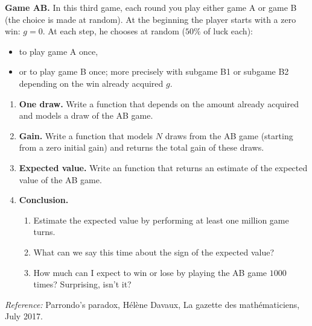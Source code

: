 \documentclass[11pt,class=report,crop=false]{standalone}
\begin{document}


\begin{activite}


\textbf{Game AB.} In this third game, each round you play either game A or game B (the choice is made at random). 
At the beginning the player starts with a zero win: $g=0$. 
At each step, he chooses at random ($50\%$ of luck each):
\begin{itemize}
  \item to play game A once,
  \item or to play game B once; more precisely with subgame B1 or subgame B2 depending on the win already acquired $g$.
\end{itemize}

\begin{enumerate}
  \item \textbf{One draw.}
  Write a  function that depends on the amount already acquired and models a draw of the AB game.
  
  \item \textbf{Gain.} Write a  function that models $N$ draws from the AB game (starting from a zero initial gain) and returns the total gain of these draws.
  
  \item \textbf{Expected value.} Write an  function that returns an estimate of the expected value of the AB game.
  
  \item \textbf{Conclusion.}
  \begin{enumerate}
    \item Estimate the expected value by performing at least one million game turns.
    \item What can we say this time about the sign of the expected value?
    \item How much can I expect to win or lose by playing the AB game $1000$ times? Surprising, isn't it?
  \end{enumerate}

\end{enumerate}
\end{activite}


\emph{Reference: } \og{}Parrondo's paradox\fg{}, Hélène Davaux, La gazette des mathématiciens, July 2017.
\end{document}
